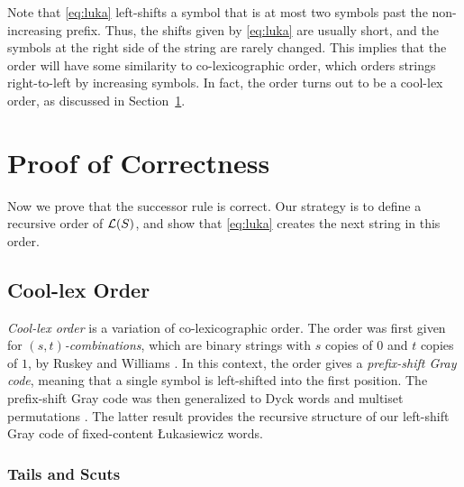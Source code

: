 Note that \eqref{eq:luka} left-shifts a symbol that is at most two symbols past the non-increasing prefix. %
Thus, the shifts given by \eqref{eq:luka} are usually short, and the symbols at the right side of the string are rarely changed.
This implies that the order will have some similarity to co-lexicographic order, which orders strings right-to-left by increasing symbols. 
In fact, the order turns out to be a cool-lex order, as discussed in Section~\ref{sec:proof}.

\section{Proof of Correctness}
\label{sec:proof}

Now we prove that the successor rule is correct. %
Our strategy is to define a recursive order of $\mathcal{L}(S)$, and show that \eqref{eq:luka} creates the next string in this order.

\subsection{Cool-lex Order}
\label{sec:proof_cool}

\emph{Cool-lex order} is a variation of co-lexicographic order.
The order was first given for \emph{$(s,t)$-combinations}, which are binary strings with $s$ copies of $0$ and $t$ copies of $1$, by Ruskey and Williams \cite{ruskey2005generating,ruskey2009coolest}.
In this context, the order gives a \emph{prefix-shift Gray code}, meaning that a single symbol is left-shifted into the first position.
The prefix-shift Gray code was then generalized to Dyck words \cite{ruskey2008generating} and multiset permutations \cite{CoolSODA}.
The latter result provides the recursive structure of our left-shift Gray code of fixed-content Łukasiewicz words.

\subsubsection{Tails and Scuts}
\label{sec:proof_scuts}

